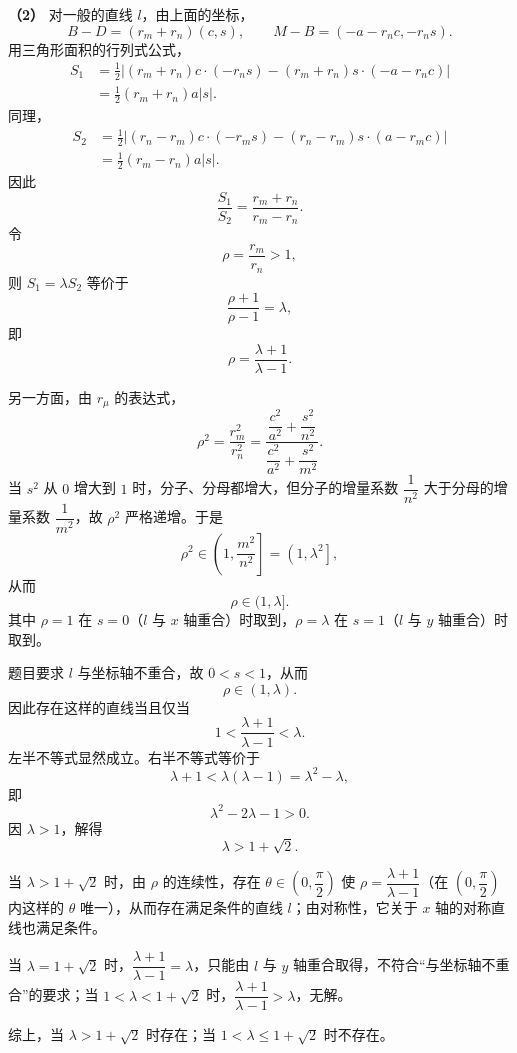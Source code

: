 \begin{answer}
\textbf{（2）} 对一般的直线 $l$，由上面的坐标，
\nopagebreak[4]
\[B-D=(r_m+r_n)(c,s),\qquad M-B=(-a-r_nc,-r_ns).\]
用三角形面积的行列式公式，
\nopagebreak[4]
\[\begin{aligned}
S_1&=\frac12\left|(r_m+r_n)c\cdot(-r_ns)-(r_m+r_n)s\cdot(-a-r_nc)\right|\\
&=\frac12(r_m+r_n)a|s|.
\end{aligned}\]
同理，
\nopagebreak[4]
\[\begin{aligned}
S_2&=\frac12\left|(r_n-r_m)c\cdot(-r_ms)-(r_n-r_m)s\cdot(a-r_mc)\right|\\
&=\frac12(r_m-r_n)a|s|.
\end{aligned}\]
因此
\nopagebreak[4]
\[\frac{S_1}{S_2}=\frac{r_m+r_n}{r_m-r_n}.\]
令
\nopagebreak[4]
\[\rho=\frac{r_m}{r_n}>1,\]
则 $S_1=\lambda S_2$ 等价于
\nopagebreak[4]
\[\frac{\rho+1}{\rho-1}=\lambda,\]
即
\nopagebreak[4]
\[\rho=\frac{\lambda+1}{\lambda-1}.\]

另一方面，由 $r_\mu$ 的表达式，
\nopagebreak[4]
\[\rho^2=\frac{r_m^2}{r_n^2}
=\frac{\dfrac{c^2}{a^2}+\dfrac{s^2}{n^2}}{\dfrac{c^2}{a^2}+\dfrac{s^2}{m^2}}.\]
当 $s^2$ 从 $0$ 增大到 $1$ 时，分子、分母都增大，但分子的增量系数 $\dfrac1{n^2}$ 大于分母的增量系数 $\dfrac1{m^2}$，故 $\rho^2$ 严格递增。于是
\nopagebreak[4]
\[\rho^2\in\left(1,\frac{m^2}{n^2}\right]=\left(1,\lambda^2\right],\]
从而
\nopagebreak[4]
\[\rho\in(1,\lambda].\]
其中 $\rho=1$ 在 $s=0$（$l$ 与 $x$ 轴重合）时取到，$\rho=\lambda$ 在 $s=1$（$l$ 与 $y$ 轴重合）时取到。

题目要求 $l$ 与坐标轴不重合，故 $0<s<1$，从而
\nopagebreak[4]
\[\rho\in(1,\lambda).\]
因此存在这样的直线当且仅当
\nopagebreak[4]
\[1<\frac{\lambda+1}{\lambda-1}<\lambda.\]
左半不等式显然成立。右半不等式等价于
\nopagebreak[4]
\[\lambda+1<\lambda(\lambda-1)=\lambda^2-\lambda,\]
即
\nopagebreak[4]
\[\lambda^2-2\lambda-1>0.\]
因 $\lambda>1$，解得
\nopagebreak[4]
\[\lambda>1+\sqrt2.\]

当 $\lambda>1+\sqrt2$ 时，由 $\rho$ 的连续性，存在 $\theta\in\left(0,\dfrac\pi2\right)$ 使 $\rho=\dfrac{\lambda+1}{\lambda-1}$（在 $\left(0,\dfrac\pi2\right)$ 内这样的 $\theta$ 唯一），从而存在满足条件的直线 $l$；由对称性，它关于 $x$ 轴的对称直线也满足条件。

当 $\lambda=1+\sqrt2$ 时，$\dfrac{\lambda+1}{\lambda-1}=\lambda$，只能由 $l$ 与 $y$ 轴重合取得，不符合“与坐标轴不重合”的要求；当 $1<\lambda<1+\sqrt2$ 时，$\dfrac{\lambda+1}{\lambda-1}>\lambda$，无解。

综上，当 $\lambda>1+\sqrt2$ 时存在；当 $1<\lambda\leqslant1+\sqrt2$ 时不存在。



\end{answer}